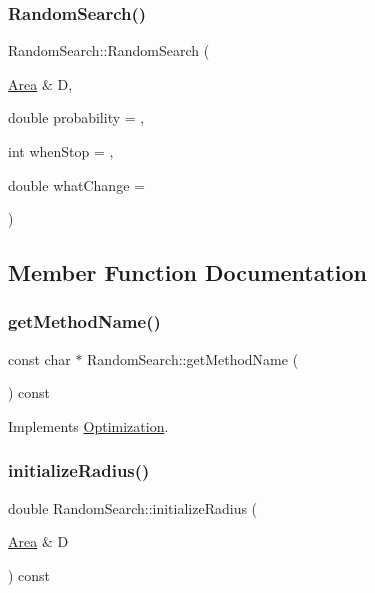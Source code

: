 \subsubsection{\texorpdfstring{Random\+Search()}{RandomSearch()}}
{\footnotesize\ttfamily Random\+Search\+::\+Random\+Search (\begin{DoxyParamCaption}\item[{\hyperlink{class_area}{Area} \&}]{D,  }\item[{double}]{probability = {},  }\item[{int}]{when\+Stop = {},  }\item[{double}]{what\+Change = {} }\end{DoxyParamCaption})}



\subsection{Member Function Documentation}
\mbox{\label{class_random_search_a84278cf5d586b2576c38d3b7f274d9c1}} 
\subsubsection{\texorpdfstring{get\+Method\+Name()}{getMethodName()}}
{\footnotesize\ttfamily const char $\ast$ Random\+Search\+::get\+Method\+Name (\begin{DoxyParamCaption}{ }\end{DoxyParamCaption}) const\hspace{0.3cm}{\ttfamily [virtual]}}



Implements \hyperlink{class_optimization_af96548088d418478485c1be6ee73905d}{Optimization}.

\mbox{\label{class_random_search_a631dca8890448081991067610a26a549}} 
\subsubsection{\texorpdfstring{initialize\+Radius()}{initializeRadius()}}
{\footnotesize\ttfamily double Random\+Search\+::initialize\+Radius (\begin{DoxyParamCaption}\item[{\hyperlink{class_area}{Area} \&}]{D }\end{DoxyParamCaption}) const}

